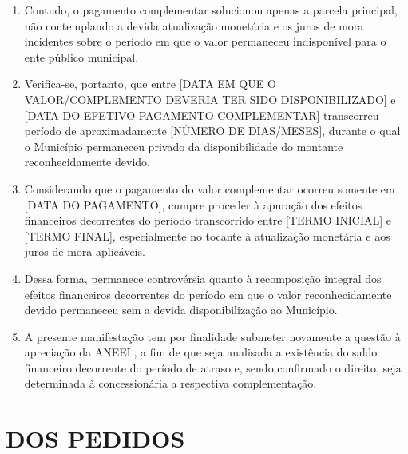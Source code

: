 \begin{enumerate}[resume]
    \item Contudo, o pagamento complementar solucionou apenas a parcela principal, não contemplando a devida atualização monetária e os juros de mora incidentes sobre o período em que o valor permaneceu indisponível para o ente público municipal.

    \item Verifica-se, portanto, que entre [DATA EM QUE O VALOR/COMPLEMENTO DEVERIA TER SIDO DISPONIBILIZADO] e [DATA DO EFETIVO PAGAMENTO COMPLEMENTAR] transcorreu período de aproximadamente [NÚMERO DE DIAS/MESES], durante o qual o Município permaneceu privado da disponibilidade do montante reconhecidamente devido.

    \item Considerando que o pagamento do valor complementar ocorreu somente em [DATA DO PAGAMENTO], cumpre proceder à apuração dos efeitos financeiros decorrentes do período transcorrido entre [TERMO INICIAL] e [TERMO FINAL], especialmente no tocante à atualização monetária e aos juros de mora aplicáveis.

    \item Dessa forma, permanece controvérsia quanto à recomposição integral dos efeitos financeiros decorrentes do período em que o valor reconhecidamente devido permaneceu sem a devida disponibilização ao Município.

    \item A presente manifestação tem por finalidade submeter novamente a questão à apreciação da ANEEL, a fim de que seja analisada a existência do saldo financeiro decorrente do período de atraso e, sendo confirmado o direito, seja determinada à concessionária a respectiva complementação.
\end{enumerate}

\section{DOS PEDIDOS}


